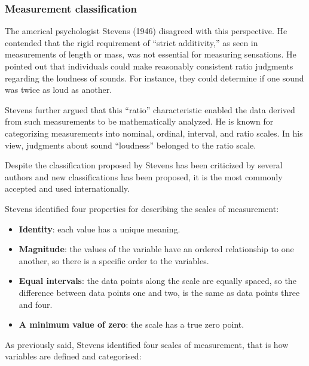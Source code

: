 \documentclass[
]{article}
\providecommand{\tightlist}{%
  \setlength{\itemsep}{0pt}\setlength{\parskip}{0pt}}\usepackage{longtable,booktabs,array}
\begin{document}
\hypertarget{measurement-classification}{%
\subsubsection*{Measurement
classification}\label{measurement-classification}}

The americal psychologist Stevens (1946) disagreed with this
perspective. He contended that the rigid requirement of ``strict
additivity,'' as seen in measurements of length or mass, was not
essential for measuring sensations. He pointed out that individuals
could make reasonably consistent ratio judgments regarding the loudness
of sounds. For instance, they could determine if one sound was twice as
loud as another.

Stevens further argued that this ``ratio'' characteristic enabled the
data derived from such measurements to be mathematically analyzed. He is
known for categorizing measurements into nominal, ordinal, interval, and
ratio scales. In his view, judgments about sound ``loudness'' belonged
to the ratio scale.

Despite the classification proposed by Stevens has been criticized by
several authors and new classifications has been proposed, it is the
most commonly accepted and used internationally.

Stevens identified four properties for describing the scales of
measurement:

\begin{itemize}
\tightlist
\item
  \textbf{Identity}: each value has a unique meaning.
\item
  \textbf{Magnitude}: the values of the variable have an ordered
  relationship to one another, so there is a specific order to the
  variables.
\item
  \textbf{Equal intervals}: the data points along the scale are equally
  spaced, so the difference between data points one and two, is the same
  as data points three and four.
\item
  \textbf{A minimum value of zero}: the scale has a true zero point.
\end{itemize}

As previously said, Stevens identified four scales of measurement, that
is how variables are defined and categorised:
\end{document}
